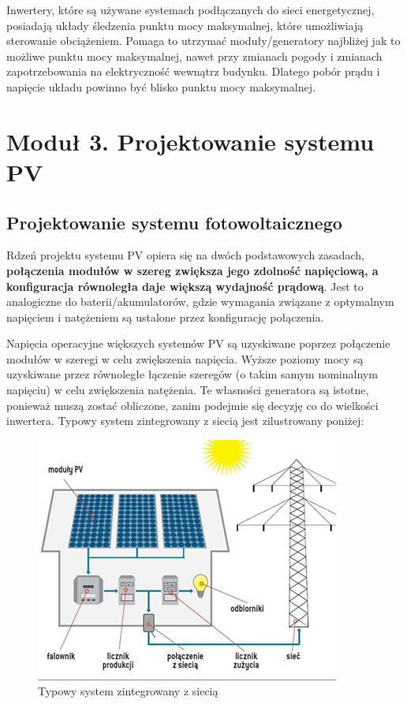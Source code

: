 \documentclass[12pt,a4paper]{article}
\begin{document}
Inwertery, które są używane systemach podłączanych do sieci 
energetycznej, posiadają układy śledzenia punktu mocy maksymalnej, które 
umożliwiają sterowanie obciążeniem. Pomaga to utrzymać moduły/generatory 
najbliżej jak to możliwe punktu mocy maksymalnej, nawet przy zmianach 
pogody i zmianach zapotrzebowania na elektryczność wewnątrz budynku. 
Dlatego pobór prądu i napięcie układu powinno być blisko punktu mocy 
maksymalnej. 
\section{Moduł 3. Projektowanie systemu PV }

\subsection{Projektowanie systemu fotowoltaicznego}

Rdzeń projektu systemu PV opiera się na dwóch podstawowych zasadach, 
\textbf{połączenia modułów w szereg zwiększa jego zdolność napięciową, a 
konfiguracja równoległa daje większą wydajność prądową}. Jest to 
analogiczne do baterii/akumulatorów, gdzie wymagania związane z 
optymalnym napięciem i natężeniem są ustalone przez konfigurację 
połączenia. 

Napięcia operacyjne większych systemów PV są uzyskiwane poprzez 
połączenie modułów w szeregi w celu zwiększenia napięcia. Wyższe poziomy 
mocy są uzyskiwane przez równoległe łączenie szeregów (o takim samym 
nominalnym napięciu) w celu zwiększenia natężenia. Te własności 
generatora są istotne, ponieważ muszą zostać obliczone, zanim podejmie 
się decyzję co do wielkości inwertera. Typowy system zintegrowany z 
siecią jest zilustrowany poniżej: 

\begin{figure}[H]
\centering
\caption{Typowy system zintegrowany z siecią}
\includegraphics[natwidth=10.90cm,natheight=8.83cm]{media/image11.jpg}
\end{figure}
\end{document}
